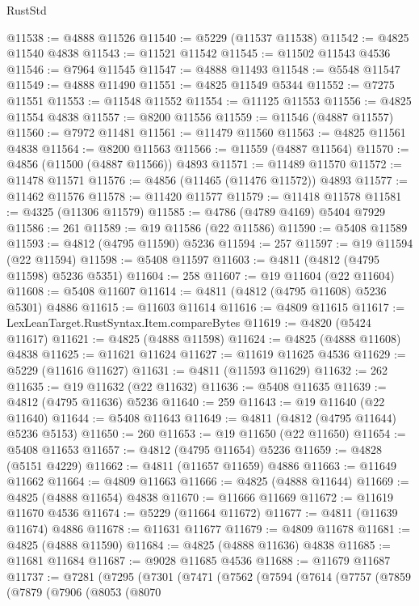 \begin{lexlean}{RustStd}
\begin{coremodule}
@11538 := @4888 @11526
@11540 := @5229 (@11537 @11538)
@11542 := @4825 @11540 @4838
@11543 := @11521 @11542
@11545 := @11502 @11543 @4536
@11546 := @7964 @11545
@11547 := @4888 @11493
@11548 := @5548 @11547
@11549 := @4888 @11490
@11551 := @4825 @11549 @5344
@11552 := @7275 @11551
@11553 := @11548 @11552
@11554 := @11125 @11553
@11556 := @4825 @11554 @4838
@11557 := @8200 @11556
@11559 := @11546 (@4887 @11557)
@11560 := @7972 @11481
@11561 := @11479 @11560
@11563 := @4825 @11561 @4838
@11564 := @8200 @11563
@11566 := @11559 (@4887 @11564)
@11570 := @4856 (@11500 (@4887 @11566)) @4893
@11571 := @11489 @11570
@11572 := @11478 @11571
@11576 := @4856 (@11465 (@11476 @11572)) @4893
@11577 := @11462 @11576
@11578 := @11420 @11577
@11579 := @11418 @11578
@11581 := @4325 (@11306 @11579)
@11585 := @4786 (@4789 @4169) @5404 @7929
@11586 := 261
@11589 := @19 @11586 (@22 @11586)
@11590 := @5408 @11589
@11593 := @4812 (@4795 @11590) @5236
@11594 := 257
@11597 := @19 @11594 (@22 @11594)
@11598 := @5408 @11597
@11603 := @4811 (@4812 (@4795 @11598) @5236 @5351)
@11604 := 258
@11607 := @19 @11604 (@22 @11604)
@11608 := @5408 @11607
@11614 := @4811 (@4812 (@4795 @11608) @5236 @5301) @4886
@11615 := @11603 @11614
@11616 := @4809 @11615
@11617 := LexLeanTarget.RustSyntax.Item.compareBytes
@11619 := @4820 (@5424 @11617)
@11621 := @4825 (@4888 @11598)
@11624 := @4825 (@4888 @11608) @4838
@11625 := @11621 @11624
@11627 := @11619 @11625 @4536
@11629 := @5229 (@11616 @11627)
@11631 := @4811 (@11593 @11629)
@11632 := 262
@11635 := @19 @11632 (@22 @11632)
@11636 := @5408 @11635
@11639 := @4812 (@4795 @11636) @5236
@11640 := 259
@11643 := @19 @11640 (@22 @11640)
@11644 := @5408 @11643
@11649 := @4811 (@4812 (@4795 @11644) @5236 @5153)
@11650 := 260
@11653 := @19 @11650 (@22 @11650)
@11654 := @5408 @11653
@11657 := @4812 (@4795 @11654) @5236
@11659 := @4828 (@5151 @4229)
@11662 := @4811 (@11657 @11659) @4886
@11663 := @11649 @11662
@11664 := @4809 @11663
@11666 := @4825 (@4888 @11644)
@11669 := @4825 (@4888 @11654) @4838
@11670 := @11666 @11669
@11672 := @11619 @11670 @4536
@11674 := @5229 (@11664 @11672)
@11677 := @4811 (@11639 @11674) @4886
@11678 := @11631 @11677
@11679 := @4809 @11678
@11681 := @4825 (@4888 @11590)
@11684 := @4825 (@4888 @11636) @4838
@11685 := @11681 @11684
@11687 := @9028 @11685 @4536
@11688 := @11679 @11687
@11737 := @7281
    (@7295
      (@7301
        (@7471
          (@7562
            (@7594
              (@7614
                (@7757
                  (@7859
                    (@7879
                      (@7906
                        (@8053
                          (@8070

\end{coremodule}
\end{lexlean}
